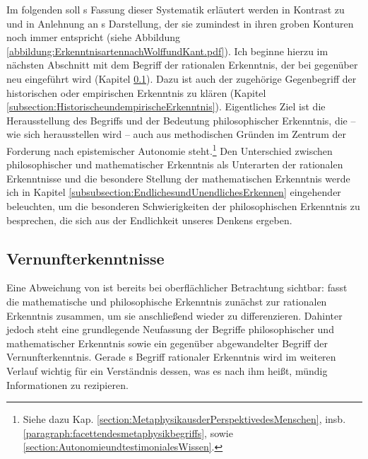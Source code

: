 Im folgenden soll s Fassung
dieser Systematik erläutert werden in Kontrast zu und in Anlehnung an
s Darstellung, der sie zumindest in
ihren groben Konturen noch immer entspricht (siehe Abbildung
\ref{abbildung:ErkenntnisartennachWolffundKant.pdf}). Ich beginne hierzu im
nächsten Abschnitt mit dem Begriff der rationalen Erkenntnis, der bei
 gegenüber  neu
eingeführt wird (Kapitel
\ref{subsection:Vernunfterkenntnis:MathematikPhilosophie}). Dazu ist auch der
zugehörige Gegenbegriff der historischen oder empirischen Erkenntnis zu klären
(Kapitel \ref{subsection:HistorischeundempirischeErkenntnis}). Eigentliches Ziel
ist die Herausstellung des Begriffs und der Bedeutung philosophischer
Erkenntnis, die -- wie sich herausstellen wird -- auch aus methodischen Gründen
im Zentrum der Forderung nach epistemischer Autonomie steht.\footnote{Siehe
dazu Kap. \ref{section:MetaphysikausderPerspektivedesMenschen}, insb.
\ref{paragraph:facettendesmetaphysikbegriffs}, sowie
\ref{section:AutonomieundtestimonialesWissen}.} Den Unterschied zwischen
philosophischer und mathematischer Erkenntnis als Unterarten der rationalen
Erkenntnisse und die besondere Stellung der mathematischen Erkenntnis werde ich
in Kapitel \ref{subsubsection:EndlichesundUnendlichesErkennen} eingehender
beleuchten, um die besonderen Schwierigkeiten der philosophischen Erkenntnis zu
besprechen, die sich aus der Endlichkeit unseres Denkens ergeben.

\subsection{Vernunfterkenntnisse}\label{subsection:Vernunfterkenntnis:MathematikPhilosophie}
Eine Abweichung von  ist bereits bei
oberflächlicher Betrachtung sichtbar:
 fasst die mathematische und philosophische Erkenntnis
zunächst zur rationalen Erkenntnis zusammen, um sie anschließend
wieder zu differenzieren. Dahinter jedoch steht eine grundlegende Neufassung der
Begriffe philosophischer und mathematischer Erkenntnis sowie ein gegenüber
abgewandelter Begriff der Vernunfterkenntnis. Gerade s
Begriff rationaler Erkenntnis wird im weiteren Verlauf wichtig für ein
Verständnis dessen, was es nach ihm heißt, mündig Informationen zu rezipieren.


